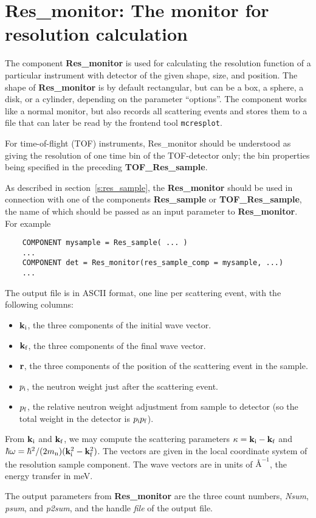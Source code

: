 \section{Res\_monitor: The monitor for resolution calculation}
\label{s:res_monitor}


The component {\bf Res\_monitor} is used for calculating the
resolution function of a particular instrument with detector of the
given shape, size, and position.
The shape of {\bf Res\_monitor} is by default rectangular,
but can be a box, a sphere, a disk, or a cylinder,
depending on the parameter ``options''.
The component works like a normal monitor, but
also records all scattering events and stores
them to a file that can later be read by 
the \MCS frontend tool \verb+mcresplot+.

For time-of-flight (TOF) instruments, {Res\_monitor} should be understood 
as giving the resolution of one time bin of the TOF-detector only; 
the bin properties being specified in the preceding {\bf TOF\_Res\_sample}.

As described in section~\ref{s:res_sample},
the {\bf Res\_monitor} should be used in connection with one of the
components {\bf Res\_sample} or {\bf TOF\_Res\_sample}, 
the name of which should be passed as an
input parameter to \textbf{Res\_monitor}. For example
\begin{lstlisting}
    COMPONENT mysample = Res_sample( ... )
    ...
    COMPONENT det = Res_monitor(res_sample_comp = mysample, ...)
    ...
\end{lstlisting}

The output file is in ASCII format, one line per scattering event, with
the following columns:
\begin{itemize}
\item ${\bf k}_{\rm i}$, the three components of the initial wave vector.
\item ${\bf k}_{\rm f}$, the three components of the final wave vector.
\item ${\bf r}$, the three components of the position of the scattering
  event in the sample.
\item $p_{\rm i}$, the neutron weight just after the scattering event.
\item $p_{\rm f}$, the relative neutron weight adjustment from sample to
  detector (so the total weight in the detector is $p_{\rm i}p_{\rm f}$).
\end{itemize}
From ${\bf k}_{\rm i}$ and ${\bf k}_{\rm f}$, we may compute 
the scattering parameters 
$\kappa = {\bf k}_{\rm i} - {\bf k}_{\rm f}$ and 
$\hbar \omega = \hbar^2/(2 m_{\rm n})({\bf k}_{\rm i}^2 - {\bf k}_{\rm f}^2)$.
The vectors are given in the local coordinate system of the resolution
sample component. The wave vectors are in units of $\mbox{\AA}^{-1}$, the
energy transfer in meV.

The output parameters from {\bf Res\_monitor}
are the three count numbers, \textit{Nsum}, \textit{psum},
and \textit{p2sum}, and the handle \textit{file} of the output file.
